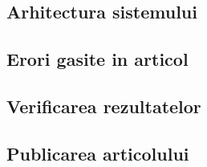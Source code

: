 \documentclass{llncs}
\begin{document}
\subsection{Arhitectura sistemului}
\subsection{Erori gasite in articol}
\subsection{Verificarea rezultatelor}
\subsection{Publicarea articolului}

%
%
%



\end{document}
